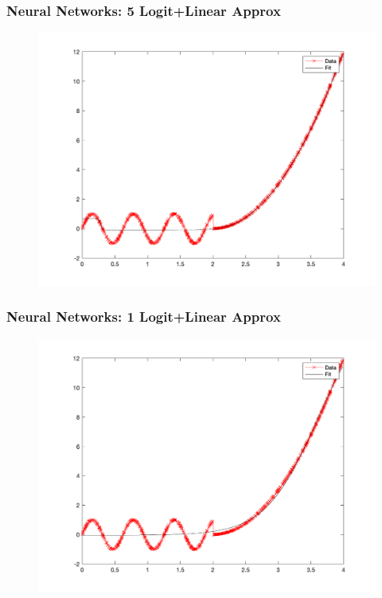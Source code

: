 \documentclass{beamer}
\begin{document}
\begin{frame}
\frametitle[alignment=center]{Neural Networks: 5 Logit+Linear Approx}
\begin{figure}
\includegraphics[scale=0.5]{NN_Example/Fig_Shallow_5.png}
\end{figure}
\end{frame}

\begin{frame}
\frametitle[alignment=center]{Neural Networks: 1 Logit+Linear Approx}
\begin{figure}
\includegraphics[scale=0.5]{NN_Example/Fig_Shallow_1.png}
\end{figure}
\end{frame}
\end{document}
